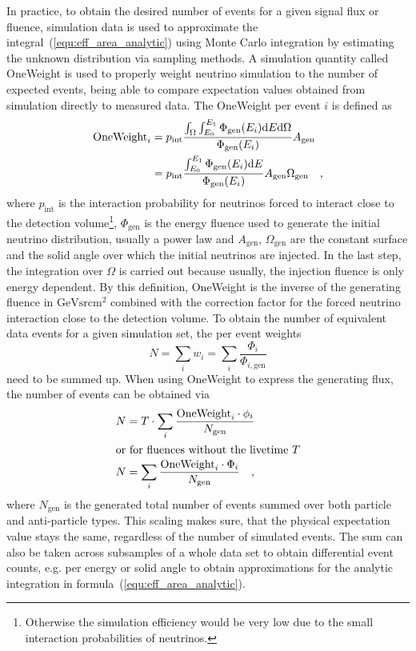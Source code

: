 In practice, to obtain the desired number of events for a given signal flux or fluence, simulation data is used to approximate the integral~(\ref{equ:eff_area_analytic}) using Monte Carlo integration by estimating the unknown distribution via sampling methods.
A simulation quantity called OneWeight is used to properly weight neutrino simulation to the number of expected events, being able to compare expectation values obtained from simulation directly to measured data.
The OneWeight per event $i$ is defined as \cite{Gazizov:2004va}
\begin{align}
  \label{equ:oneweight_definition}
  \text{OneWeight}_i
  &= p_\text{int}\frac{\int_\Omega\int_{E_0}^{E_1}
                       \Phi_\text{gen}(E_i)\mathrm{d}E\mathrm{d}\Omega
                       }{\Phi_\text{gen}(E_i)}A_\text{gen} \\
  &= p_\text{int}\frac{\int_{E_0}^{E_1}\Phi_\text{gen}(E_i)\mathrm{d}E}
                      {\Phi_\text{gen}(E_i)}
    A_\text{gen}\Omega_\text{gen}
  \quad\text{,}
\end{align}
where $p_\text{int}$ is the interaction probability for neutrinos forced to interact close to the detection volume\footnote{Otherwise the simulation efficiency would be very low due to the small interaction probabilities of neutrinos.}, $\Phi_\text{gen}$ is the energy fluence used to generate the initial neutrino distribution, usually a power law and $A_\text{gen}$, $\Omega_\text{gen}$ are the constant surface and the solid angle over which the initial neutrinos are injected.
In the last step, the integration over $\Omega$ is carried out because usually, the injection fluence is only energy dependent.
By this definition, OneWeight is the inverse of the generating fluence in $\si{\GeV\steradian\cm\squared}$ combined with the correction factor for the forced neutrino interaction close to the detection volume.
To obtain the number of equivalent data events for a given simulation set, the per event weights
\begin{equation}
  N = \sum_i w_i = \sum_i \frac{\Phi_i}{\Phi_{i,\text{gen}}}
\end{equation}
need to be summed up.
When using OneWeight to express the generating flux, the number of events can be obtained via
\begin{align}
  N &= T \cdot \sum_i \frac{\text{OneWeight}_i \cdot \phi_i}{N_\text{gen}} \\
  \intertext{or for fluences without the livetime $T$}
  N &= \sum_i \frac{\text{OneWeight}_i \cdot \Phi_i}{N_\text{gen}}
  \quad\text{,}
\end{align}
where $N_\text{gen}$ is the generated total number of events summed over both particle and anti-particle types.
This scaling makes sure, that the physical expectation value stays the same, regardless of the number of simulated events.
The sum can also be taken across subsamples of a whole data set to obtain differential event counts, e.g. per energy or solid angle to obtain approximations for the analytic integration in formula~(\ref{equ:eff_area_analytic}).

